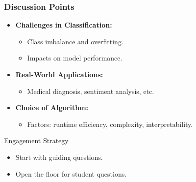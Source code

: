 \documentclass[aspectratio=169]{beamer}
\begin{document}
\begin{frame}[fragile]
    \frametitle{Discussion Points}
    \begin{itemize}
        \item \textbf{Challenges in Classification:}
        \begin{itemize}
            \item Class imbalance and overfitting.
            \item Impacts on model performance.
        \end{itemize}
        
        \item \textbf{Real-World Applications:}
        \begin{itemize}
            \item Medical diagnosis, sentiment analysis, etc.
        \end{itemize}
        
        \item \textbf{Choice of Algorithm:}
        \begin{itemize}
            \item Factors: runtime efficiency, complexity, interpretability.
        \end{itemize}
    \end{itemize}
    
    \begin{block}{Engagement Strategy}
        \begin{itemize}
            \item Start with guiding questions.
            \item Open the floor for student questions.
        \end{itemize}
    \end{block}
\end{frame}
\end{document}

